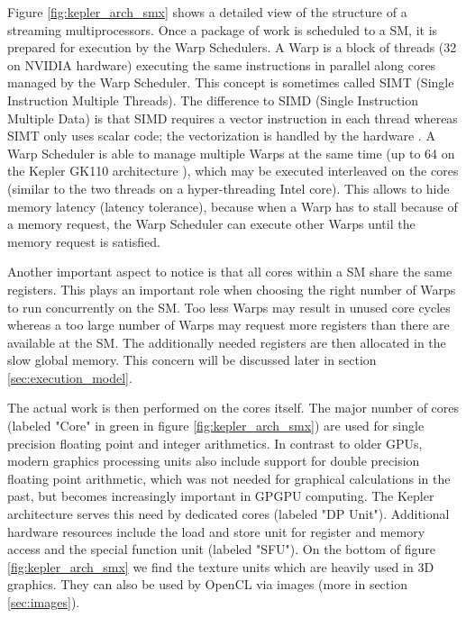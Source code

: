 Figure \ref{fig:kepler_arch_smx} shows a detailed view of the structure of a streaming multiprocessors. Once a package of work is scheduled to a SM, it is prepared for execution by the Warp Schedulers. A Warp is a block of threads (32 on NVIDIA hardware) executing the same instructions in parallel along cores managed by the Warp Scheduler. This concept is sometimes called SIMT (Single Instruction Multiple Threads). The difference to SIMD (Single Instruction Multiple Data) is that SIMD requires a vector instruction in each thread whereas SIMT only uses scalar code; the vectorization is handled by the hardware \cite[p.99]{gpu_optimizations}. A Warp Scheduler is able to manage multiple Warps at the same time (up to 64 on the Kepler GK110 architecture \cite[p.7]{kepler_arch}), which may be executed interleaved on the cores (similar to the two threads on a hyper-threading Intel core). This allows to hide memory latency (latency tolerance), because when a Warp has to stall because of a memory request, the Warp Scheduler can execute other Warps until the memory request is satisfied.


Another important aspect to notice is that all cores within a SM share the same registers. This plays an important role when choosing the right number of Warps to run concurrently on the SM. Too less Warps may result in unused core cycles whereas a too large number of Warps may request more registers than there are available at the SM. The additionally needed registers are then allocated in the slow global memory. This concern will be discussed later in section \ref{sec:execution_model}.

The actual work is then performed on the cores itself. The major number of cores (labeled "Core" in green in figure \ref{fig:kepler_arch_smx}) are used for single precision floating point and integer arithmetics. In contrast to older GPUs, modern graphics processing units also include support for double precision floating point arithmetic, which was not needed for graphical calculations in the past, but becomes increasingly important in GPGPU computing. The Kepler architecture serves this need by dedicated cores (labeled "DP Unit"). Additional hardware resources include the load and store unit for register and memory access and the special function unit (labeled "SFU"). On the bottom of figure \ref{fig:kepler_arch_smx} we find the texture units which are heavily used in 3D graphics. They can also be used by OpenCL via images (more in section \ref{sec:images}).

